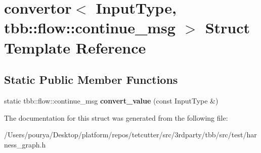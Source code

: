 \hypertarget{structconvertor_3_01InputType_00_01tbb_1_1flow_1_1continue__msg_01_4}{}\section{convertor$<$ Input\+Type, tbb\+:\+:flow\+:\+:continue\+\_\+msg $>$ Struct Template Reference}
\label{structconvertor_3_01InputType_00_01tbb_1_1flow_1_1continue__msg_01_4}
\subsection*{Static Public Member Functions}
\begin{DoxyCompactItemize}
\item 
\hypertarget{structconvertor_3_01InputType_00_01tbb_1_1flow_1_1continue__msg_01_4_a81917552a671bf2664016065a6169b76}{}static tbb\+::flow\+::continue\+\_\+msg {\bfseries convert\+\_\+value} (const Input\+Type \&)\label{structconvertor_3_01InputType_00_01tbb_1_1flow_1_1continue__msg_01_4_a81917552a671bf2664016065a6169b76}

\end{DoxyCompactItemize}


The documentation for this struct was generated from the following file\+:\begin{DoxyCompactItemize}
\item 
/\+Users/pourya/\+Desktop/platform/repos/tetcutter/src/3rdparty/tbb/src/test/harness\+\_\+graph.\+h\end{DoxyCompactItemize}

